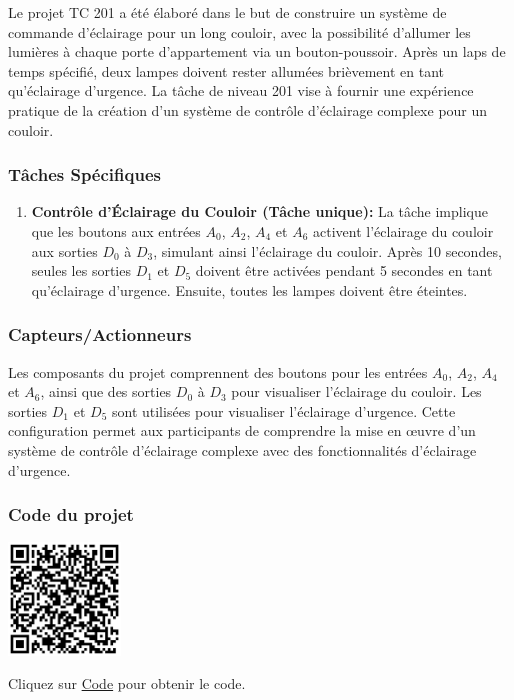 \documentclass[a4paper,12pt]{report}
\begin{document}
Le projet TC 201 a été élaboré dans le but de construire un système de commande d'éclairage pour un long couloir, avec la possibilité d'allumer les lumières à chaque porte d'appartement via un bouton-poussoir. Après un laps de temps spécifié, deux lampes doivent rester allumées brièvement en tant qu'éclairage d'urgence. La tâche de niveau 201 vise à fournir une expérience pratique de la création d'un système de contrôle d'éclairage complexe pour un couloir.

\subsubsection{Tâches Spécifiques}

\begin{enumerate}
    \item \textbf{Contrôle d'Éclairage du Couloir (Tâche unique):} La tâche implique que les boutons aux entrées \(A_0\), \(A_2\), \(A_4\) et \(A_6\) activent l'éclairage du couloir aux sorties \(D_0\) à \(D_3\), simulant ainsi l'éclairage du couloir. Après 10 secondes, seules les sorties \(D_1\) et \(D_5\) doivent être activées pendant 5 secondes en tant qu'éclairage d'urgence. Ensuite, toutes les lampes doivent être éteintes.
\end{enumerate}

\subsubsection{Capteurs/Actionneurs}

Les composants du projet comprennent des boutons pour les entrées \(A_0\), \(A_2\), \(A_4\) et \(A_6\), ainsi que des sorties \(D_0\) à \(D_3\) pour visualiser l'éclairage du couloir. Les sorties \(D_1\) et \(D_5\) sont utilisées pour visualiser l'éclairage d'urgence. Cette configuration permet aux participants de comprendre la mise en œuvre d'un système de contrôle d'éclairage complexe avec des fonctionnalités d'éclairage d'urgence.

\subsubsection{Code du projet}

\begin{minipage}{0.5\textwidth}
    \includegraphics[height=3cm]{Code TC201.png}
\end{minipage}%
\begin{minipage}{0.5\textwidth}
    Cliquez sur \href{https://github.com/DexterTaha/Controllino-PLC-Sample/blob/main/TC200/TC201_Lumi%C3%A8re_du_couloir/TC201_Lumi%C3%A8re_du_couloir.ino}{Code} pour obtenir le code.
\end{minipage}
\end{document}
